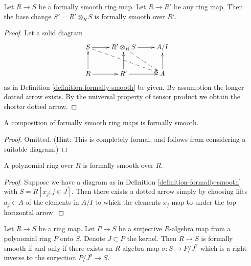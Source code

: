 \begin{lemma}
\label{lemma-base-change-fs}
Let $R \to S$ be a formally smooth ring map.
Let $R \to R'$ be any ring map.
Then the base change $S' = R' \otimes_R S$ is formally smooth over $R'$.
\end{lemma}

\begin{proof}
Let a solid diagram
$$
\xymatrix{
S \ar[r] \ar@{-->}[rrd] & R' \otimes_R S \ar[r] \ar@{-->}[rd] & A/I \\
R  \ar[u] \ar[r] & R' \ar[r] \ar[u] & A \ar[u]
}
$$
as in Definition \ref{definition-formally-smooth} be given.
By assumption the longer dotted arrow exists. By the universal
property of tensor product we obtain the shorter dotted arrow.
\end{proof}

\begin{lemma}
\label{lemma-compose-formally-smooth}
A composition of formally smooth ring maps is formally smooth.
\end{lemma}

\begin{proof}
Omitted. (Hint: This is completely formal, and follows from considering
a suitable diagram.)
\end{proof}

\begin{lemma}
\label{lemma-polynomial-ring-formally-smooth}
A polynomial ring over $R$ is formally smooth over $R$.
\end{lemma}

\begin{proof}
Suppose we have a diagram as in Definition \ref{definition-formally-smooth}
with $S = R[x_j; j \in J]$. Then there exists a dotted arrow
simply by choosing lifts $a_j \in A$ of the elements in $A/I$
to which the elements $x_j$ map to under the top horizontal arrow.
\end{proof}

\begin{lemma}
\label{lemma-characterize-formally-smooth}
Let $R \to S$ be a ring map.
Let $P \to S$ be a surjective $R$-algebra map from a
polynomial ring $P$ onto $S$. Denote $J \subset P$ the
kernel. Then $R \to S$ is formally smooth if and only
if there exists an $R$-algebra map $\sigma : S \to P/J^2$
which is a right inverse to the surjection
$P/J^2 \to S$.
\end{lemma}

